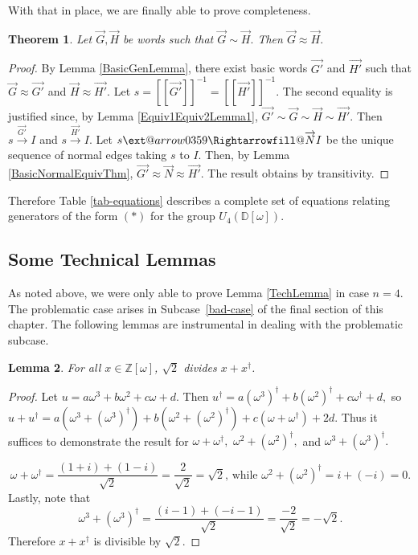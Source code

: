 \documentclass{dalthesis}
\makeatletter
\theoremstyle{theorem}
\newtheorem{theorem}{Theorem}
\newtheorem{lemma}[theorem]{Lemma}
\theoremstyle{definition}
\theoremstyle{definition}  %
\theoremstyle{definition}
\newcommand{\Z}{\mathbb{Z}}
\newcommand{\D}{\mathbb{D}}
\newcommand{\sem}[1]{[\![#1]\!]}
\renewcommand{\:}{\mathbin{:}}
\newcommand{\xRightarrow}[2][]{\ext@arrow
  0359\Rightarrowfill@{#1}{#2}}
\newcommand{\edge}{\xrightarrow}
\newcommand{\nedge}{\xRightarrow}
\renewcommand{\vec}{\overrightarrow}
\makeatother
\begin{document}
With that in place, we are finally able to prove completeness.

\begin{theorem}
\label{Equiv2Equiv1Thm}
Let $\vec{G},\vec{H}$ be words such that $\vec{G}\sim\vec{H}.$ Then $\vec{G}\approx\vec{H}.$
\end{theorem}
\begin{proof}
By Lemma \ref{BasicGenLemma}, there exist basic words $\vec{G'}$ and $\vec{H'}$ such that $\vec{G}\approx\vec{G'}$ and $\vec{H}\approx\vec{H'}.$ Let $s = \sem{\vec{G'}}^{-1} = \sem{\vec{H'}}^{-1}.$ The second equality is justified since, by Lemma \ref{Equiv1Equiv2Lemma1}, $\vec{G'}\sim\vec{G}\sim\vec{H}\sim\vec{H'}.$ Then $s\edge{\vec{G'}}I$ and $s\edge{\vec{H'}}I.$ Let $s\nedge{\vec{N}}I$ be the unique sequence of normal edges taking $s$ to $I.$  Then, by Lemma \ref{BasicNormalEquivThm}, $\vec{G'}\approx\vec{N}\approx\vec{H'}.$ The result obtains by transitivity.
\end{proof}

Therefore Table \ref{tab-equations} describes a complete set of equations relating generators of the form $(*)$ for the group $U_4(\D[\omega]).$

\subsection{Some Technical Lemmas}

As noted above, we were only able to prove Lemma \ref{TechLemma} in case $n = 4.$ The problematic case arises in Subcase~\ref{bad-case} of the final section of this chapter. The following lemmas are instrumental in dealing with the problematic subcase.

\begin{lemma}
\label{AddCongLemma}
For all $x\in\Z[\omega]$, $\sqrt{2}$ divides $x + x^\dagger$. 
\end{lemma}
\begin{proof}
Let $u = a\omega^3 + b\omega^2 + c\omega + d.$ Then
$u^\dagger = a(\omega^3)^\dagger + b(\omega^2)^\dagger + c \omega^\dagger + d,$
so $u + u^\dagger = a(\omega^3 + (\omega^3)^\dag) + b (\omega^2 + (\omega^2)^\dag) + c (\omega + \omega^\dag) + 2d$. Thus it suffices to demonstrate the result for $\omega+\omega^\dag,$ $\omega^2+(\omega^2)^\dagger,$ and $\omega^3+(\omega^3)^\dag.$

\[
\omega+\omega^\dag = \frac{(1+i)+(1-i)}{\sqrt{2}} = \frac{2}{\sqrt{2}} = \sqrt{2}\mbox{, while }\omega^2+(\omega^2)^\dag = i + (-i) = 0.
\]
Lastly, note that \[
\omega^3+(\omega^3)^\dag = \frac{(i-1)+(-i-1)}{\sqrt{2}} = \frac{-2}{\sqrt{2}} = -\sqrt{2}.
\]
Therefore $x+x^\dagger$ is divisible by $\sqrt{2}.$
\end{proof}
\end{document}
